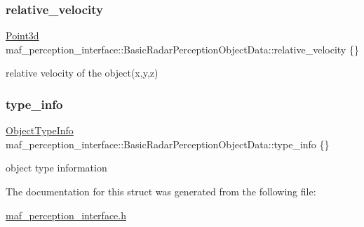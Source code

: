 \subsubsection{\texorpdfstring{relative\+\_\+velocity}{relative\_velocity}}
{\footnotesize\ttfamily \hyperlink{structmaf__perception__interface_1_1Point3d}{Point3d} maf\+\_\+perception\+\_\+interface\+::\+Basic\+Radar\+Perception\+Object\+Data\+::relative\+\_\+velocity \{\}}



relative velocity of the object(x,y,z) 

\mbox{\label{structmaf__perception__interface_1_1BasicRadarPerceptionObjectData_a88b30069295d7189475bef88f6cf8f4b}} 
\subsubsection{\texorpdfstring{type\+\_\+info}{type\_info}}
{\footnotesize\ttfamily \hyperlink{structmaf__perception__interface_1_1ObjectTypeInfo}{Object\+Type\+Info} maf\+\_\+perception\+\_\+interface\+::\+Basic\+Radar\+Perception\+Object\+Data\+::type\+\_\+info \{\}}



object type information 



The documentation for this struct was generated from the following file\+:\begin{DoxyCompactItemize}
\item 
\hyperlink{maf__perception__interface_8h}{maf\+\_\+perception\+\_\+interface.\+h}\end{DoxyCompactItemize}
